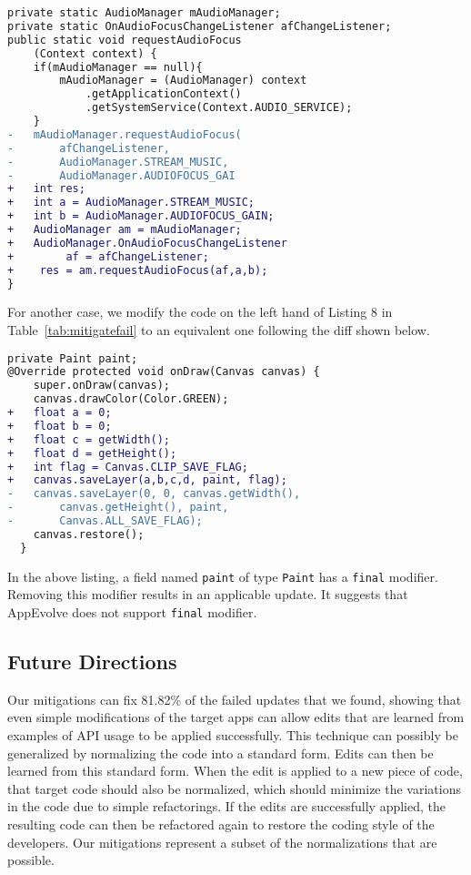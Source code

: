 \vspace{0.5cm}\begin{lstlisting}[language=diff,numbers=none]
private static AudioManager mAudioManager;
private static OnAudioFocusChangeListener afChangeListener;
public static void requestAudioFocus
    (Context context) {
    if(mAudioManager == null){
        mAudioManager = (AudioManager) context
            .getApplicationContext()
            .getSystemService(Context.AUDIO_SERVICE);
    }
-   mAudioManager.requestAudioFocus(
-       afChangeListener,
-       AudioManager.STREAM_MUSIC,
-       AudioManager.AUDIOFOCUS_GAI
+   int res;
+   int a = AudioManager.STREAM_MUSIC;
+   int b = AudioManager.AUDIOFOCUS_GAIN;
+   AudioManager am = mAudioManager;
+   AudioManager.OnAudioFocusChangeListener
+        af = afChangeListener;
+    res = am.requestAudioFocus(af,a,b);
}
\end{lstlisting}


\vspace{0.5cm} For another case, we modify the code on the left hand of Listing 8 in Table~\ref{tab:mitigatefail} to an equivalent one following the diff shown below.

\vspace{0.5cm}\begin{lstlisting}[language=diff,numbers=none]
private Paint paint;
@Override protected void onDraw(Canvas canvas) {
    super.onDraw(canvas);
    canvas.drawColor(Color.GREEN);
+   float a = 0;
+   float b = 0;
+   float c = getWidth();
+   float d = getHeight();
+   int flag = Canvas.CLIP_SAVE_FLAG;
+   canvas.saveLayer(a,b,c,d, paint, flag);
-   canvas.saveLayer(0, 0, canvas.getWidth(),
-       canvas.getHeight(), paint,
-       Canvas.ALL_SAVE_FLAG);
    canvas.restore();
  }
\end{lstlisting}

\vspace{0.5cm}In the above listing, a field named {\tt paint} of type {\tt Paint} has a {\tt final} modifier. Removing this modifier results in an applicable update. It suggests that AppEvolve does not support {\tt final} modifier.

\subsection{Future Directions}

Our mitigations can fix 81.82\% of the failed updates that we found,
showing that even simple modifications of the target apps can allow
edits that are learned from examples of API usage to be applied
successfully. This technique can possibly be generalized by normalizing the
code into a standard form. Edits can then be learned from this standard
form. When the edit is applied to a new piece of code, that target code
should also be normalized, which should minimize the variations in the code
due to simple refactorings. If the edits are successfully applied, the
resulting code can then be refactored again to restore the coding
style of the developers.  Our mitigations represent a subset of the normalizations that are
possible.

